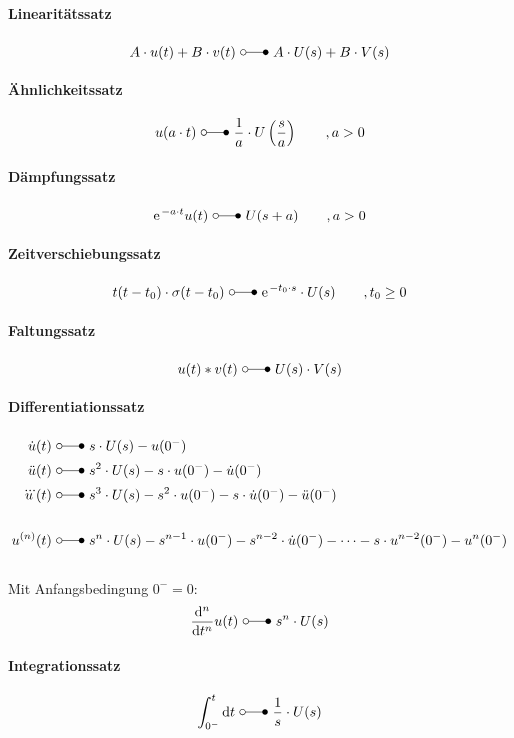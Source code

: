 \paragraph{Linearitätssatz}
\[
	A \cdot u(t) + B \cdot v(t) \ \laplace\ A \cdot U(s) + B \cdot V(s) 
\]

\paragraph{Ähnlichkeitssatz}
\[
	u(a \cdot t)\ \laplace \ \frac{1}{a} \cdot U\left(\frac{s}{a}\right) \qquad ,a>0
\]

\paragraph{Dämpfungssatz}
\[
	\e^{-a\cdot t}u(t) \ \laplace \ U(s + a) \qquad ,a>0	
\]

\paragraph{Zeitverschiebungssatz}
\[
	t(t-t_0) \cdot \sigma (t-t_0) \ \laplace \ \e^{-t_0 \cdot s} \cdot U(s)	\qquad ,t_0 \geq 0
\]

\paragraph{Faltungssatz}
\[
	u(t) \ast v(t) \ \laplace \ U(s) \cdot V(s)
\]

\paragraph{Differentiationssatz}
\[\begin{aligned}
	\dot{u}(t) \ &\laplace \ s \cdot U(s) - u(0^-) \\
	\ddot{u}(t) \ &\laplace \ s^2 \cdot U(s) - s \cdot u(0^-) -  \dot{u}(0^-) \\
	\dddot{u}(t) \ &\laplace \ s^3 \cdot U(s) - s^2 \cdot u(0^-) - s \cdot \dot{u}(0^-) - \ddot{u}(0^-)\\
	\\
	u^{(n)}(t) \ &\laplace \ s^n \cdot U(s) - s^{n-1} \cdot u(0^-) - s^{n-2} \cdot \dot{u}(0^-) - \dots - s \cdot u^{n-2}(0^-) - u^n(0^-)
\end{aligned}\]
~\\
Mit Anfangsbedingung $0^- = 0$:
\[
	\difrac{^n}{t^n}u(t) \ \laplace \ s^n \cdot U(s)
\]

\paragraph{Integrationssatz}
\[
	\int_{0^-}^{t} \di t \ \laplace \ \frac{1}{s}\cdot U(s)
\]
\\

